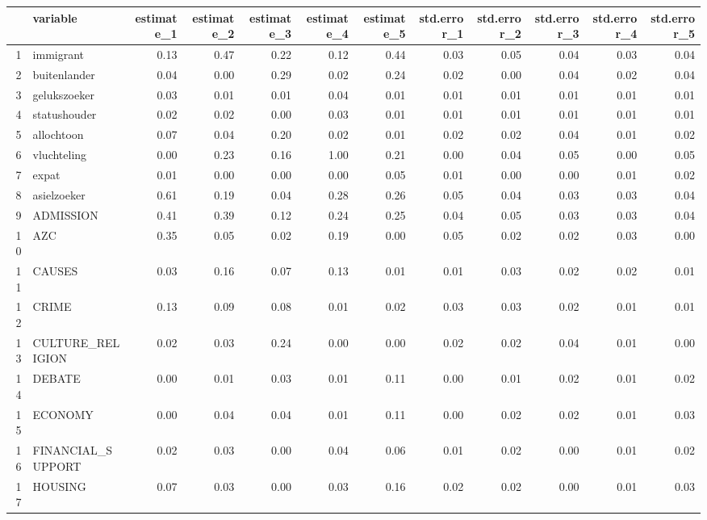 \begin{table}[ht]
\centering
\begin{tabular}{rlrrrrrrrrrr}
  \hline
 & variable & estimate\_1 & estimate\_2 & estimate\_3 & estimate\_4 & estimate\_5 & std.error\_1 & std.error\_2 & std.error\_3 & std.error\_4 & std.error\_5 \\ 
  \hline
1 & immigrant & 0.13 & 0.47 & 0.22 & 0.12 & 0.44 & 0.03 & 0.05 & 0.04 & 0.03 & 0.04 \\ 
  2 & buitenlander & 0.04 & 0.00 & 0.29 & 0.02 & 0.24 & 0.02 & 0.00 & 0.04 & 0.02 & 0.04 \\ 
  3 & gelukszoeker & 0.03 & 0.01 & 0.01 & 0.04 & 0.01 & 0.01 & 0.01 & 0.01 & 0.01 & 0.01 \\ 
  4 & statushouder & 0.02 & 0.02 & 0.00 & 0.03 & 0.01 & 0.01 & 0.01 & 0.01 & 0.01 & 0.01 \\ 
  5 & allochtoon & 0.07 & 0.04 & 0.20 & 0.02 & 0.01 & 0.02 & 0.02 & 0.04 & 0.01 & 0.02 \\ 
  6 & vluchteling & 0.00 & 0.23 & 0.16 & 1.00 & 0.21 & 0.00 & 0.04 & 0.05 & 0.00 & 0.05 \\ 
  7 & expat & 0.01 & 0.00 & 0.00 & 0.00 & 0.05 & 0.01 & 0.00 & 0.00 & 0.01 & 0.02 \\ 
  8 & asielzoeker & 0.61 & 0.19 & 0.04 & 0.28 & 0.26 & 0.05 & 0.04 & 0.03 & 0.03 & 0.04 \\ 
  9 & ADMISSION & 0.41 & 0.39 & 0.12 & 0.24 & 0.25 & 0.04 & 0.05 & 0.03 & 0.03 & 0.04 \\ 
  10 & AZC & 0.35 & 0.05 & 0.02 & 0.19 & 0.00 & 0.05 & 0.02 & 0.02 & 0.03 & 0.00 \\ 
  11 & CAUSES & 0.03 & 0.16 & 0.07 & 0.13 & 0.01 & 0.01 & 0.03 & 0.02 & 0.02 & 0.01 \\ 
  12 & CRIME & 0.13 & 0.09 & 0.08 & 0.01 & 0.02 & 0.03 & 0.03 & 0.02 & 0.01 & 0.01 \\ 
  13 & CULTURE\_RELIGION & 0.02 & 0.03 & 0.24 & 0.00 & 0.00 & 0.02 & 0.02 & 0.04 & 0.01 & 0.00 \\ 
  14 & DEBATE & 0.00 & 0.01 & 0.03 & 0.01 & 0.11 & 0.00 & 0.01 & 0.02 & 0.01 & 0.02 \\ 
  15 & ECONOMY & 0.00 & 0.04 & 0.04 & 0.01 & 0.11 & 0.00 & 0.02 & 0.02 & 0.01 & 0.03 \\ 
  16 & FINANCIAL\_SUPPORT & 0.02 & 0.03 & 0.00 & 0.04 & 0.06 & 0.01 & 0.02 & 0.00 & 0.01 & 0.02 \\ 
  17 & HOUSING & 0.07 & 0.03 & 0.00 & 0.03 & 0.16 & 0.02 & 0.02 & 0.00 & 0.01 & 0.03 \\ 

\end{tabular}
\end{table}

